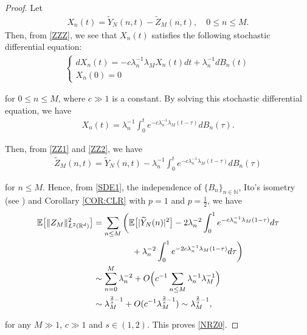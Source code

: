 \documentclass[%
11pt,  reqno]{amsart}
\theoremstyle{remarkstyle}
\newcommand{\1}{\hspace{0.2mm}\text{I}\hspace{0.2mm}}
\newcommand{\noi}{\noindent}
\newcommand{\R}{\mathbb{R}}
\newcommand{\E}{\mathbb{E}}
\newcommand{\ld}{\lambda}
\newcommand{\wt}{\widetilde}
\renewcommand{\O}{\Omega}
\newcommand{\les}{\lesssim}
\newcommand{\N}{\mathbb{N}}
\numberwithin{equation}{section}
\numberwithin{theorem}{section}
\begin{document}
	\begin{proof}
		Let 
		\begin{align}
			X_n(t)=\wt Y_N(n, t)- \wt Z_{M}(n, t), 
			\quad 0\le n \le M.
			\label{ZZ1} 
		\end{align}
		Then,  from  \eqref{ZZZ}, 
		we see that $X_n(t)$ satisfies 
		the following stochastic differential equation:
		\begin{align*}
			\begin{cases}
				dX_n(t)=- c \ld_n^{-1} \ld_M  X_n(t) dt + \ld_n^{-1} dB_n(t)\\
				X_n(0)=0
			\end{cases}
		\end{align*}	
		
		\noi
		for $0\le n \le M$, where $c \gg 1$ is a constant.
		By solving this stochastic differential equation, we have
		\begin{align}
			X_n(t)= \ld_n^{-1} \int_0^t e^{- c  \ld_n^{-1} \ld_M  (t-\tau)}dB_n(\tau).
			\label{ZZ2}
		\end{align}
		
		\noi
		Then, from \eqref{ZZ1} and \eqref{ZZ2}, we have 
		\begin{align}
			\wt Z_{M}(n, t)= \wt Y_N(n, t)- \ld_n^{-1} \int_0^t  e^{-   c \ld_n^{-1} \ld_M  (t-\tau)} dB_n(\tau)
			\label{SDE1}
		\end{align}
		
		\noi
		for $n \le M$. Hence, from \eqref{SDE1}, the independence of $\{B_n \}_{n \in \N}$, 
		Ito's isometry (see \cite[Section 4.2]{Evans12}) and Corollary \ref{COR:CLR} with $p = 1$ and $p = \frac12$, we have
		\begin{align}
			\begin{split}
				\E \big[ \|Z_M\|_{L^2 ({\R^d})}^2 \big]&=\sum_{n \le M} \bigg( \E \big[  | \wt Y_N(n) |^2  \big]
				- 2 \ld_n^{- 2} \int_0^1 e^{-  c \ld_n^{-1} \ld_M    (1-\tau)}d\tau \\
				& \hphantom{XXXXX}
				+ \ld_n^{- 2} \int_0^1 e^{-2 c \ld_n^{-1} \ld_M   (1-\tau)}d\tau \bigg)\\
				& \sim \sum_{n=0}^M\ld_n^{-2} + O\Big( c^{-1}\sum_{n \le M } \ld_n^{-1} \ld_M^{-1}  \Big)\\
				& \sim \ld_M^{\frac2s-1} + O(c^{-1} \ld_M^{\frac{2}s-1}) \sim \ld_M^{\frac2s-1},
			\end{split}
			\label{ZZ3}
		\end{align}
		
		\noi
		for any $M\gg 1$, $c \gg 1$ and $s \in (1,2)$.
		This proves \eqref{NRZ0}.
		

\end{proof}
\end{document}
